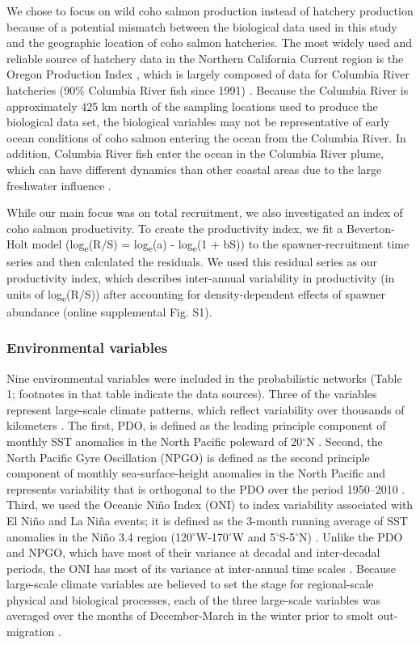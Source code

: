 We chose to focus on wild coho salmon production instead of hatchery production
because of a potential mismatch between the biological data used in this study
and the geographic location of coho salmon hatcheries. The most widely used and
reliable source of hatchery data in the Northern California Current region is
the Oregon Production Index \citep{Logerwell2003a, Koslow2002a, Cole2000a},
which is largely composed of data for Columbia River hatcheries (90\% Columbia
River fish since 1991) \citep{PFMC2013}. Because the Columbia River is
approximately 425 km north of the sampling locations used to produce the
biological data set, the biological variables may not be representative of early
ocean conditions of coho salmon entering the ocean from the Columbia River. In
addition, Columbia River fish enter the ocean in the Columbia River plume, which
can have different dynamics than other coastal areas due to the large freshwater
influence \citep{Hickey1998}.

While our main focus was on total recruitment, we also investigated an index of
coho salmon productivity. To create the productivity index, we fit a
Beverton-Holt model (log\textsubscript{e}(R/S) = log\textsubscript{e}(a) -
log\textsubscript{e}(1 + bS)) \citep{Beverton1957a} to the spawner-recruitment
time series and then calculated the residuals. We used this residual series as
our productivity index, which describes inter-annual variability in productivity
(in units of log\textsubscript{e}(R/S)) after accounting for density-dependent
effects of spawner abundance (online supplemental Fig. S1).


\subsubsection{Environmental variables}

Nine environmental variables were included in the probabilistic networks (Table
1; footnotes in that table indicate the data sources). Three of the variables
represent large-scale climate patterns, which reflect variability over thousands
of kilometers \citep{King2011}. The first, PDO, is defined as the leading
principle component of monthly SST anomalies in the North Pacific poleward of
20$^{\circ}$N \citep{Mantua1997a}.  Second, the North Pacific Gyre Oscillation (NPGO) is
defined as the second principle component of monthly sea-surface-height
anomalies in the North Pacific and represents variability that is orthogonal to
the PDO over the period 1950--2010 \citep{Di-Lorenzo2008a}. Third, we used the
Oceanic Niño Index (ONI) to index variability associated with El Niño and La
Niña events; it is defined as the 3-month running average of SST anomalies in
the Niño 3.4 region (120$^{\circ}$W-170$^{\circ}$W and 5$^{\circ}$S-5$^{\circ}$N) \citep{Trenberth1997}. Unlike the
PDO and NPGO, which have most of their variance at decadal and inter-decadal
periods, the ONI has most of its variance at inter-annual time scales
\citep{Sarachik2010a}. Because large-scale climate variables are believed to set
the stage for regional-scale physical and biological processes, each of the
three large-scale variables was averaged over the months of December-March in
the winter prior to smolt out-migration \citep{Mantua1997a, Yeh2011,
DiLorenzo2013a}.


